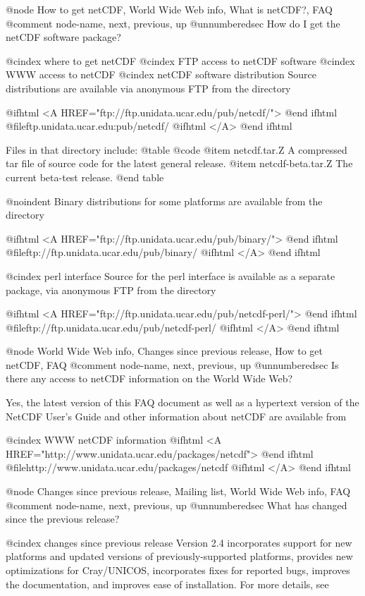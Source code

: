 {@node How to get netCDF, World Wide Web info, What is netCDF?, FAQ
@comment  node-name,  next,  previous,  up
@unnumberedsec How do I get the netCDF software package?

@cindex where to get netCDF
@cindex FTP access to netCDF software
@cindex WWW access to netCDF
@cindex netCDF software distribution
Source distributions are available via anonymous FTP from the directory

@ifhtml
<A HREF="ftp://ftp.unidata.ucar.edu/pub/netcdf/">
@end ifhtml
@file{ftp.unidata.ucar.edu:pub/netcdf/}
@ifhtml
</A>
@end ifhtml

Files in that directory include:
@table @code
@item netcdf.tar.Z
A compressed tar file of source code for the latest general
release.
@item netcdf-beta.tar.Z
The current beta-test release.
@end table

@noindent
Binary distributions for some platforms are available from the
directory

@ifhtml
<A HREF="ftp://ftp.unidata.ucar.edu/pub/binary/">
@end ifhtml
@file{ftp://ftp.unidata.ucar.edu/pub/binary/}
@ifhtml
</A>
@end ifhtml

@cindex perl interface
Source for the perl interface is available as a separate package,
via anonymous FTP from the directory

@ifhtml
<A HREF="ftp://ftp.unidata.ucar.edu/pub/netcdf-perl/">
@end ifhtml
@file{ftp://ftp.unidata.ucar.edu/pub/netcdf-perl/}
@ifhtml
</A>
@end ifhtml

@node World Wide Web info, Changes since previous release, How to get netCDF, FAQ
@comment  node-name,  next,  previous,  up
@unnumberedsec Is there any access to netCDF information on the World Wide Web?

Yes, the latest version of this FAQ document as well as a hypertext
version of the NetCDF User's Guide and other information about netCDF
are available from

@cindex WWW netCDF information
@ifhtml
<A HREF="http://www.unidata.ucar.edu/packages/netcdf">
@end ifhtml
@file{http://www.unidata.ucar.edu/packages/netcdf}
@ifhtml
</A>
@end ifhtml

@node Changes since previous release, Mailing list, World Wide Web info, FAQ
@comment  node-name,  next,  previous,  up
@unnumberedsec What has changed since the previous release?

@cindex changes since previous release
Version 2.4 incorporates support for new platforms and updated versions
of previously-supported platforms, provides new optimizations for
Cray/UNICOS, incorporates fixes for reported bugs, improves the
documentation, and improves ease of
installation.  For more details, see

}
